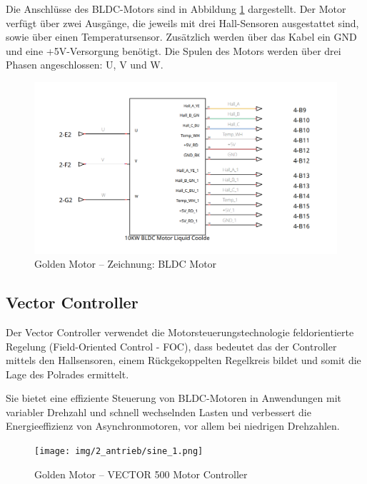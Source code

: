 Die Anschlüsse des BLDC-Motors sind in Abbildung \ref{img_2_2:circ_bldc:1} dargestellt. Der Motor verfügt über zwei Ausgänge, die jeweils mit drei Hall-Sensoren ausgestattet sind, sowie über einen Temperatursensor. Zusätzlich werden über das Kabel ein GND und eine +5V-Versorgung benötigt. Die Spulen des Motors werden über drei Phasen angeschlossen: U, V und W.

\begin{figure}[ht]
	\begin{center}
		\includegraphics[width=1\textwidth]{img/2_imp/2_circ_bldc_motor.png}
		\caption{Golden Motor – Zeichnung: BLDC Motor}
		\label{img_2_2:circ_bldc:1}
	\end{center}
\end{figure}


\subsection{Vector Controller}
Der Vector Controller verwendet die Motorsteuerungstechnologie feldorientierte Regelung (Field-Oriented Control - FOC), dass bedeutet das der Controller mittels den Hallsensoren, einem Rückgekoppelten Regelkreis bildet und somit die Lage des Polrades ermittelt.

\cite{schroeder:elektische_antriebe}

Sie bietet eine effiziente Steuerung von BLDC-Motoren in Anwendungen mit variabler Drehzahl und schnell wechselnden Lasten und verbessert die Energieeffizienz von Asynchronmotoren, vor allem bei niedrigen Drehzahlen.


\begin{figure}[!ht]
	\begin{center}
		\texttt{[image: img/2\_antrieb/sine\_1.png]}
		\caption{Golden Motor – VECTOR 500 Motor Controller}
		\label{img_2_2:antrieb_sine:1}
	\end{center}
\end{figure}


